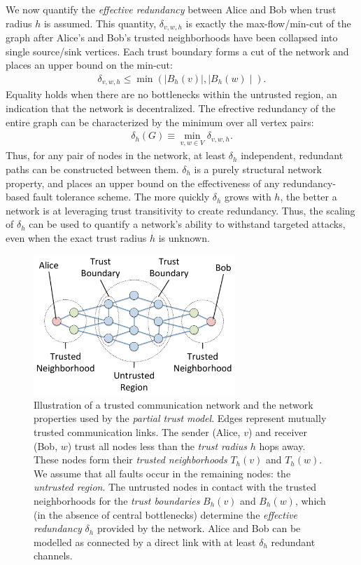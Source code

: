 \documentclass[twocolumn]{article}
\newcommand{\beq}{\begin{eqnarray}}
\newcommand{\eeq}{\end{eqnarray}}
\begin{document}
We now quantify the {\em effective redundancy} between Alice and Bob
when trust radius $h$ is assumed.
This quantity, $\delta_{v,w,h}$ is exactly the max-flow/min-cut of
the graph after Alice's and Bob's trusted neighborhoods have been
collapsed into single source/sink vertices.
Each trust boundary forms a cut of the network and places an upper bound on the
min-cut:
\beq
\delta_{v,w,h} \leq \min\left( \mid B_h(v) \mid, \mid B_h(w) \mid \right).
\eeq
Equality holds when there are no bottlenecks within the untrusted region,
an indication that the network is decentralized.
The efrective redundancy of the entire graph can be characterized by the minimum over
all vertex pairs:
\beq
\delta_h(G) \equiv \min_{v,w \in V} \delta_{v,w,h}.
\eeq
Thus, for any pair of nodes in the network, at least $\delta_h$ independent,
redundant paths can be constructed between them.
$\delta_h$ is a purely structural network property,
and places an upper bound on the effectiveness of any
redundancy-based fault tolerance scheme.
The more quickly $\delta_h$ grows with $h$,
the better a network is at leveraging trust transitivity to create redundancy.
Thus, the scaling of $\delta_h$ can be used to quantify a network's ability
to withstand targeted attacks,
even when the exact trust radius $h$ is unknown.

\begin{figure}
\centerline{\includegraphics[width=3in,height=2.08in]{fig-partial-trust}}
\caption{
Illustration of a trusted communication network and the network properties
used by the {\em partial trust model}.
Edges represent mutually trusted communication links.
The sender (Alice, $v$) and receiver (Bob, $w$) trust all nodes
less than the {\em trust radius} $h$ hops away.
These nodes form their {\em trusted neighborhoods} $T_h(v)$ and $T_h(w)$.
We assume that all faults occur in the remaining nodes: the
{\em untrusted region}.
The untrusted nodes in contact with the trusted neighborhoods for the
{\em trust boundaries} $B_h(v)$ and $B_h(w)$,
which (in the absence of central bottlenecks) determine the
{\em effective redundancy} $\delta_h$ provided by the network.
Alice and Bob can be modelled as connected by a direct link with
at least $\delta_h$ redundant channels.
}
\label{fig:trust-source}
\end{figure}
\end{document}

